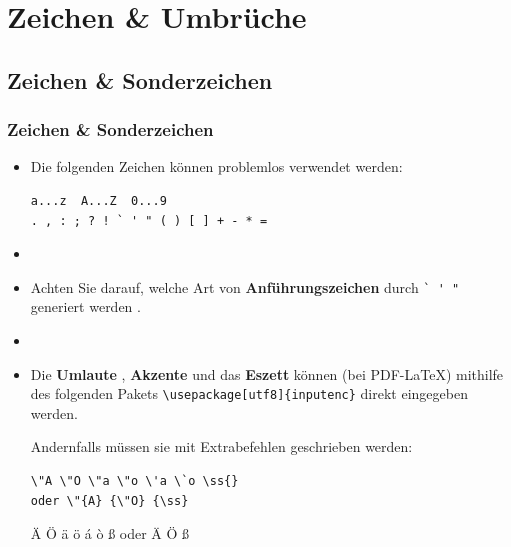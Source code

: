 \section{Zeichen \& Umbrüche}


\subsection{Zeichen \& Sonderzeichen}

\begin{frame}[fragile]
\frametitle{Zeichen \& Sonderzeichen}

\begin{itemize}
\item Die folgenden Zeichen können problemlos verwendet werden:\\ 

\begin{lstlisting}
a...z  A...Z  0...9
. , : ; ? ! ` ' " ( ) [ ] + - * =
\end{lstlisting}

\item[]

\item Achten Sie darauf, welche Art von \textbf{Anführungszeichen} durch \lstinline|` ' "|  generiert werden \citep[vgl.][]{MyP17c}. 

\item[]

\item Die \textbf{Umlaute} , \textbf{Akzente}  und das \textbf{Eszett}  können (bei PDF-\LaTeX ) mithilfe des folgenden Pakets \lstinline|\usepackage[utf8]{inputenc}| direkt eingegeben werden.

Andernfalls müssen sie mit Extrabefehlen geschrieben werden:


\begin{lstlisting}
\"A \"O \"a \"o \'a \`o \ss{} 
oder \"{A} {\"O} {\ss} 
\end{lstlisting}

\ea \"A \"O \"a \"o \'a \`o \ss{} oder \"{A} {\"O} {\ss} 
\z 

\end{itemize}

\end{frame}



